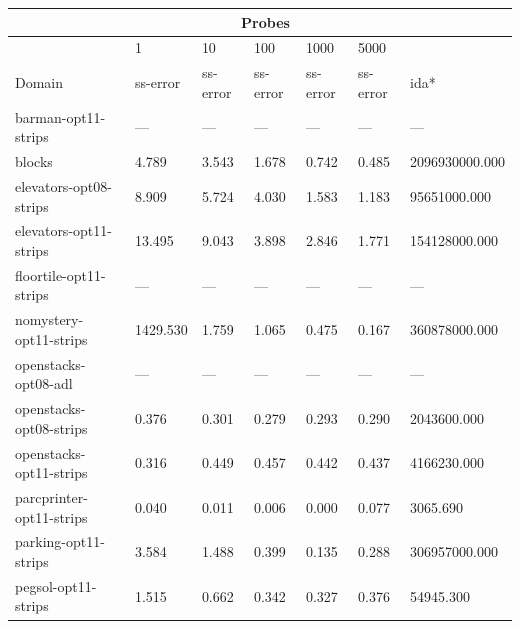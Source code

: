 \documentclass[11pt,a4paper,oneside]{report}
\begin{document}
\footnotesize  %
\setlength\LTleft{100pt}            %
\setlength\LTright{200pt}           %
\begin{longtable}{@{\extracolsep{\fill}} lllllll @{}}
\hline
                         & \multicolumn{5}{c}{Probes}                          &                \\ \hline
                         & 1        & 10       & 100      & 1000     & 5000     &                \\ \hline
Domain                   & ss-error & ss-error & ss-error & ss-error & ss-error & ida*           \\ \hline
barman-opt11-strips      & ---      & ---      & ---      & ---      & ---      & ---            \\ \hline
blocks                   & 4.789    & 3.543    & 1.678    & 0.742    & 0.485    & 2096930000.000 \\ \hline
elevators-opt08-strips   & 8.909    & 5.724    & 4.030    & 1.583    & 1.183    & 95651000.000   \\ \hline
elevators-opt11-strips   & 13.495   & 9.043    & 3.898    & 2.846    & 1.771    & 154128000.000  \\ \hline
floortile-opt11-strips   & ---      & ---      & ---      & ---      & ---      & ---            \\ \hline
nomystery-opt11-strips   & 1429.530 & 1.759    & 1.065    & 0.475    & 0.167    & 360878000.000  \\ \hline
openstacks-opt08-adl     & ---      & ---      & ---      & ---      & ---      & ---            \\ \hline
openstacks-opt08-strips  & 0.376    & 0.301    & 0.279    & 0.293    & 0.290    & 2043600.000    \\ \hline
openstacks-opt11-strips  & 0.316    & 0.449    & 0.457    & 0.442    & 0.437    & 4166230.000    \\ \hline
parcprinter-opt11-strips & 0.040    & 0.011    & 0.006    & 0.000    & 0.077    & 3065.690       \\ \hline
parking-opt11-strips     & 3.584    & 1.488    & 0.399    & 0.135    & 0.288    & 306957000.000  \\ \hline
pegsol-opt11-strips      & 1.515    & 0.662    & 0.342    & 0.327    & 0.376    & 54945.300      \\ \hline

\end{longtable}
\end{document}
